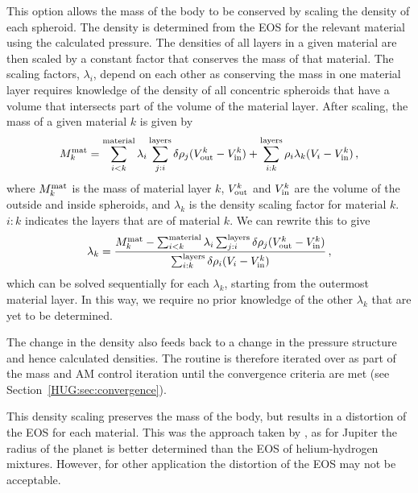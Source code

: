 \documentclass[11pt, oneside]{article}   	%
\begin{document}
This option allows the mass of the body to be conserved by scaling the density of each spheroid.
The density is determined from the EOS for the relevant material using the calculated pressure. The densities of all layers in a given material are then scaled by a constant factor that conserves the mass of that material.
The scaling factors, $\lambda_i$, depend on each other as conserving the mass in one material layer requires knowledge of the density of all concentric spheroids that have a volume that intersects part of the volume of the material layer.
After scaling, the mass of a given material $k$ is given by
%
\begin{align}
\begin{aligned}
M_{k}^{\rm mat} =\sum_{i<k}^{\rm material} \lambda_i \sum_{j:i}^{\rm layers}  \delta \rho_j (V_{\rm out}^k - V_{\rm in}^k) +\sum_{i:k}^{\rm layers} \rho_i \lambda_k (V_{i} - V_{\rm in}^k) \, ,
\end{aligned}
\end{align}
%
where $M_k^{\rm mat}$ is the mass of material layer $k$, $V_{\rm out}^k$ and $V_{\rm in}^k$ are the volume of the outside and inside spheroids, and $\lambda_k$ is the density scaling factor for material $k$. $i:k$ indicates the layers that are of material $k$.
We can rewrite this to give
%
\begin{align}
\begin{aligned}
\lambda_k = \frac{M_{k}^{\rm mat} -\sum_{i<k}^{\rm material} \lambda_i \sum_{j :i}^{\rm layers}  \delta\rho_j (V_{\rm out}^k - V_{\rm in}^k) }{\sum_{i:k}^{\rm layers} \delta\rho_i  (V_{i} - V_{\rm in}^k)} \, ,
\end{aligned}
\end{align}
%
which can be solved sequentially for each $\lambda_k$, starting from the outermost material layer. 
In this way, we require no prior knowledge of the other $\lambda_k$ that are yet to be determined. 

The change in the density also feeds back to a change in the pressure structure and hence calculated densities. 
The routine is therefore iterated over as part of the mass and AM control iteration until the convergence criteria are met (see Section~\ref{HUG:sec:convergence}). 

This density scaling preserves the mass of the body, but results in a distortion of the EOS for each material.
This was the approach taken by \cite{Hubbard2013}, as for Jupiter the radius of the planet is better determined than the EOS of helium-hydrogen mixtures. 
However, for other application the distortion of the EOS may not be acceptable. 
\end{document}
